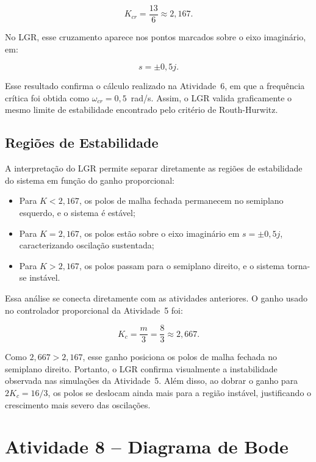 \documentclass[12pt,a4paper]{article}
\begin{document}
\begin{equation}
  K_{cr}=\frac{13}{6}\approx2{,}167.
\end{equation}

No LGR, esse cruzamento aparece nos pontos marcados sobre o eixo imaginário, em:

\begin{equation}
  s=\pm0{,}5j.
\end{equation}

Esse resultado confirma o cálculo realizado na Atividade~6, em que a frequência crítica foi obtida como $\omega_{cr}=0{,}5$~rad/s. Assim, o LGR valida graficamente o mesmo limite de estabilidade encontrado pelo critério de Routh-Hurwitz.

\subsection{Regiões de Estabilidade}

A interpretação do LGR permite separar diretamente as regiões de estabilidade do sistema em função do ganho proporcional:

\begin{itemize}
  \item Para $K<2{,}167$, os polos de malha fechada permanecem no semiplano esquerdo, e o sistema é estável;
  \item Para $K=2{,}167$, os polos estão sobre o eixo imaginário em $s=\pm0{,}5j$, caracterizando oscilação sustentada;
  \item Para $K>2{,}167$, os polos passam para o semiplano direito, e o sistema torna-se instável.
\end{itemize}

Essa análise se conecta diretamente com as atividades anteriores. O ganho usado no controlador proporcional da Atividade~5 foi:

\begin{equation}
  K_c=\frac{m}{3}=\frac{8}{3}\approx2{,}667.
\end{equation}

Como $2{,}667>2{,}167$, esse ganho posiciona os polos de malha fechada no semiplano direito. Portanto, o LGR confirma visualmente a instabilidade observada nas simulações da Atividade~5. Além disso, ao dobrar o ganho para $2K_c=16/3$, os polos se deslocam ainda mais para a região instável, justificando o crescimento mais severo das oscilações.


\section{Atividade 8 -- Diagrama de Bode}
\end{document}
